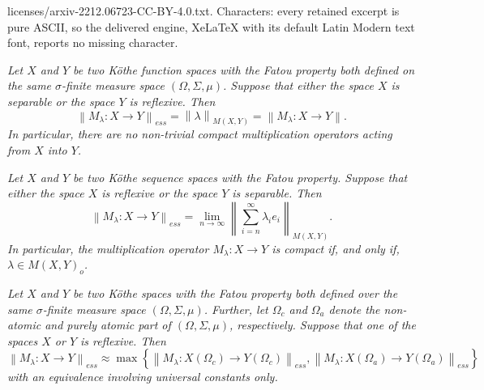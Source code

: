 \documentclass[10pt,a4paper]{amsart}
\newcommand{\norm}[1]{\left\lVert#1\right\rVert}
\begin{document}
licenses/arxiv-2212.06723-CC-BY-4.0.txt. Characters: every retained excerpt is pure ASCII, so the delivered engine, XeLaTeX with its default Latin Modern text font, reports no missing character.
\begin{theorem} \label{THM: essnorm multipliers function}
	{\it Let $X$ and $Y$ be two K{\" o}the function spaces with the Fatou property both defined on the same $\sigma$-finite
		measure space $(\Omega,\Sigma,\mu)$. Suppose that either the space $X$ is separable or the space $Y$ is reflexive.
		Then
		\begin{equation*}
			\norm{M_{\lambda} \colon X \rightarrow Y}_{ess} = \norm{\lambda}_{M(X,Y)} = \norm{M_{\lambda} \colon X \rightarrow Y}.
		\end{equation*}
		In particular, there are no non-trivial compact multiplication operators acting from $X$ into $Y$.}
\end{theorem}

\begin{theorem} \label{THM: Essential norm Kothe sequence}
	{\it Let $X$ and $Y$ be two K{\" o}the sequence spaces with the Fatou property. Suppose that either the space $X$ is reflexive
		or the space $Y$ is separable. Then
	\begin{equation*}
		\norm{M_{\lambda} \colon X \rightarrow Y}_{ess} = \lim\limits_{n \rightarrow \infty} \norm{ \sum_{i=n}^{\infty} \lambda_i e_i }_{M(X,Y)}.
	\end{equation*}
		In particular, the multiplication operator $M_{\lambda} \colon X \rightarrow Y$ is compact if, and only if, $\lambda \in M(X,Y)_o$.}
\end{theorem}

\begin{theorem} \label{THM: ess norm func + seq}
	{\it Let $X$ and $Y$ be two K{\" o}the spaces with the Fatou property both defined over the same $\sigma$-finite measure space $(\Omega,\Sigma,\mu)$.
		Further, let $\Omega_c$ and $\Omega_a$ denote the non-atomic and purely atomic part of $(\Omega,\Sigma,\mu)$, respectively.
		Suppose that one of the spaces $X$ or $Y$ is reflexive. Then}
		\begin{equation*}
			\norm{M_{\lambda} \colon X \rightarrow Y}_{ess} \approx
				\max \left\{ \norm{M_{\lambda} \colon X(\Omega_c) \rightarrow Y(\Omega_c)}_{ess}, \norm{M_{\lambda} \colon X(\Omega_a) \rightarrow Y(\Omega_a)}_{ess} \right\}
		\end{equation*}
	{\it with an equivalence involving universal constants only.}
\end{theorem}
\end{document}
